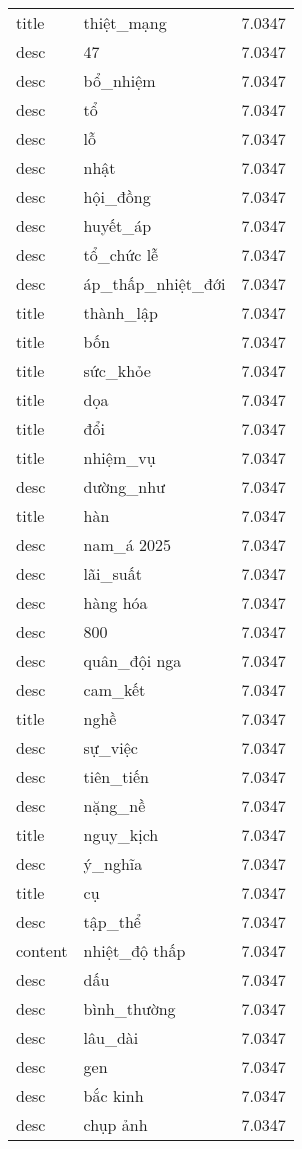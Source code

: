 \documentclass{article}
\begin{document}
\begin{tabular}{lll}
title & thiệt\_mạng & 7.0347\\
desc & 47 & 7.0347\\
desc & bổ\_nhiệm & 7.0347\\
desc & tổ & 7.0347\\
desc & lỗ & 7.0347\\
desc & nhật & 7.0347\\
desc & hội\_đồng & 7.0347\\
desc & huyết\_áp & 7.0347\\
desc & tổ\_chức lễ & 7.0347\\
desc & áp\_thấp\_nhiệt\_đới & 7.0347\\
title & thành\_lập & 7.0347\\
title & bốn & 7.0347\\
title & sức\_khỏe & 7.0347\\
title & dọa & 7.0347\\
title & đổi & 7.0347\\
title & nhiệm\_vụ & 7.0347\\
desc & dường\_như & 7.0347\\
title & hàn & 7.0347\\
desc & nam\_á 2025 & 7.0347\\
desc & lãi\_suất & 7.0347\\
desc & hàng hóa & 7.0347\\
desc & 800 & 7.0347\\
desc & quân\_đội nga & 7.0347\\
desc & cam\_kết & 7.0347\\
title & nghề & 7.0347\\
desc & sự\_việc & 7.0347\\
desc & tiên\_tiến & 7.0347\\
desc & nặng\_nề & 7.0347\\
title & nguy\_kịch & 7.0347\\
desc & ý\_nghĩa & 7.0347\\
title & cụ & 7.0347\\
desc & tập\_thể & 7.0347\\
content & nhiệt\_độ thấp & 7.0347\\
desc & dấu & 7.0347\\
desc & bình\_thường & 7.0347\\
desc & lâu\_dài & 7.0347\\
desc & gen & 7.0347\\
desc & bắc kinh & 7.0347\\
desc & chụp ảnh & 7.0347\\

\end{tabular}
\end{document}
